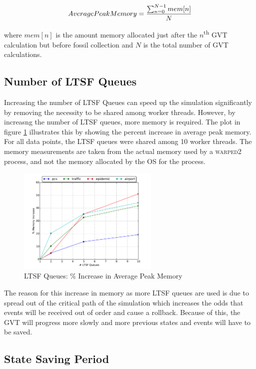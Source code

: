 \documentclass[11pt]{book}
\begin{document}
$$ Average Peak Memory = {\sum_{n=0}^{N-1} {mem[n]} \over N} $$

\noindent
where $mem[n]$ is the amount memory allocated just after the $n$\textsuperscript{th} GVT calculation
but before fossil collection and $N$ is the total number of GVT calculations.

\subsection{Number of LTSF Queues}

Increasing the number of LTSF Queues can speed up the simulation significantly by removing
the necessity to be shared among worker threads. However, by increasng the number of LTSF queues,
more memory is required. The plot in figure \ref{ltsf_memory} illustrates this by showing the
percent increase in average peak memory. For all data points, the LTSF queues were shared among
10 worker threads. The memory measurements are taken from the actual memory used by a
\textsc{warped2} process, and not the memory allocated by the OS for the process.

\begin{figure}
  \centering
  \includegraphics[width=0.6\textwidth,keepaspectratio,quiet]{figs/pending_event_set/ltsf_memory_increase.pdf}
  \caption{LTSF Queues: \% Increase in Average Peak Memory}\label{ltsf_memory}
\end{figure}

The reason for this increase in memory as more LTSF queues are used is due to spread out of the
critical path of the simulation which increases the odds that events will be received out of
order and cause a rollback. Because of this, the GVT will progress more slowly and more previous
states and events will have to be saved. 

\subsection{State Saving Period}
\end{document}

